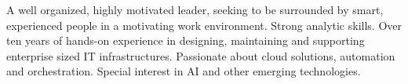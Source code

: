 A well organized, highly motivated leader, seeking to be surrounded by smart, experienced people in a motivating work environment. Strong analytic skills. Over ten years of hands-on experience in designing, maintaining and supporting enterprise sized IT infrastructures. Passionate about cloud solutions, automation and orchestration. Special interest in AI and other emerging technologies.
